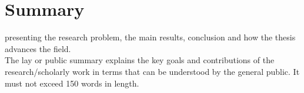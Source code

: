 \chapter*{Summary}
   presenting the research problem, the main results, conclusion and how the thesis 
  advances the field. \\
  The lay or public summary explains the key goals and contributions of the research/scholarly work 
  in terms that can be understood by the general public. It must not exceed 150 words in length.

